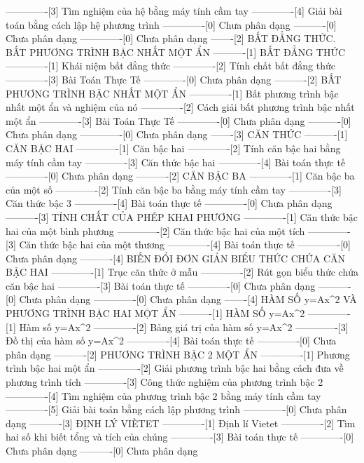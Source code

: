 -------------[3] Tìm nghiệm của hệ bằng máy tính cầm tay
-------------[4] Giải bài toán bằng cách lập hệ phương trình
-------------[0] Chưa phân dạng
----------[0] Chưa phân dạng
-------------[0] Chưa phân dạng
-------[2] BẤT ĐẲNG THỨC. BẤT PHƯƠNG TRÌNH BẬC NHẤT MỘT ẨN
----------[1] BẤT ĐẲNG THỨC
-------------[1] Khái niệm bất đẳng thức
-------------[2] Tính chất bất đẳng thức
-------------[3] Bài Toán Thực Tế
-------------[0] Chưa phân dạng
----------[2] BẤT PHƯƠNG TRÌNH BẬC NHẤT MỘT ẨN
-------------[1] Bất phương trình bậc nhất một ẩn và nghiệm của nó
-------------[2] Cách giải bất phương trình bậc nhất một ẩn
-------------[3] Bài Toán Thực Tế
-------------[0] Chưa phân dạng
----------[0] Chưa phân dạng
-------------[0] Chưa phân dạng
-------[3] CĂN THỨC
----------[1] CĂN BẬC HAI
-------------[1] Căn bậc hai
-------------[2] Tính căn bậc hai bằng máy tính cầm tay
-------------[3] Căn thức bậc hai
-------------[4] Bài toán thực tế
-------------[0] Chưa phân dạng
----------[2] CĂN BẬC BA
-------------[1] Căn bậc ba của một số
-------------[2] Tính căn bậc ba bằng máy tính cầm tay
-------------[3] Căn thức bậc 3
-------------[4] Bài toán thực tế
-------------[0] Chưa phân dạng
----------[3] TÍNH CHẤT CỦA PHÉP KHAI PHƯƠNG
-------------[1] Căn thức bậc hai của một bình phương
-------------[2] Căn thức bậc hai của một tích
-------------[3] Căn thức bậc hai của một thương
-------------[4] Bài toán thực tế
-------------[0] Chưa phân dạng
----------[4] BIẾN ĐỔI ĐƠN GIẢN BIỂU THỨC CHỨA CĂN BẬC HAI
-------------[1] Trục căn thức ở mẫu
-------------[2] Rút gọn biểu thức chứa căn bậc hai
-------------[3] Bài toán thực tế
-------------[0] Chưa phân dạng
----------[0] Chưa phân dạng
-------------[0] Chưa phân dạng
-------[4] HÀM SỐ y=Ax^2 VÀ PHƯƠNG TRÌNH BẬC HAI MỘT ẨN
----------[1] HÀM SỐ y=Ax^2
-------------[1] Hàm số y=Ax^2
-------------[2] Bảng giá trị của hàm số y=Ax^2
-------------[3] Đồ thị của hàm số y=Ax^2
-------------[4] Bài toán thực tế
-------------[0] Chưa phân dạng
----------[2] PHƯƠNG TRÌNH BẬC 2 MỘT ẨN
-------------[1] Phương trình bậc hai một ẩn
-------------[2] Giải phương trình bậc hai bằng cách đưa về phương trình tích
-------------[3] Công thức nghiệm của phương trình bậc 2
-------------[4] Tìm nghiệm của phương trình bậc 2 bằng máy tính cầm tay
-------------[5] Giải bài toán bằng cách lập phương trình
-------------[0] Chưa phân dạng
----------[3] ĐỊNH LÝ VIÈTET
-------------[1] Định lí Vietet
-------------[2] Tìm hai số khi biết tổng và tích của chúng
-------------[3] Bài toán thực tế
-------------[0] Chưa phân dạng
----------[0] Chưa phân dạng
